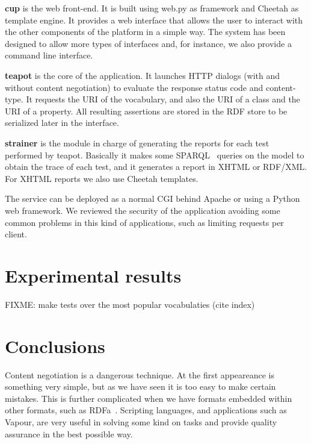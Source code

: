 \documentclass{../templates/llncs}
\begin{document}
\begin{description}

  \item \textbf{cup} is the web front-end. It is built using web.py as framework
        and Cheetah as template engine. It provides a web interface that allows 
        the user to interact with the other components of the platform in a 
        simple way. The system has been designed to allow more types 
        of interfaces and, for instance, we also provide a command line interface.

  \item \textbf{teapot} is the core of the application. It launches
        HTTP dialogs 
        (with and without content negotiation) to evaluate the response
        status code and content-type. It requests the URI of the vocabulary, and also the 
        URI of a class and the URI of a property. All resulting assertions are 
        stored in the RDF store to be serialized later in the interface.

  \item \textbf{strainer} is the module in charge of generating the reports for
        each test performed by teapot. Basically it makes some SPARQL~\cite{SPARQL} queries
        on the model to obtain the trace of each test, and it generates a
        report in XHTML or RDF/XML. For XHTML reports we also use Cheetah 
        templates.

\end{description}

The service can be deployed as a normal CGI behind Apache or using a Python web 
framework. We reviewed the security of the application avoiding some common problems
in this kind of applications, such as limiting requests per client.

\section{\label{sec:experimental}Experimental results}

FIXME: make tests over the most popular vocabulaties (cite index)

\section{\label{sec:conclusions}Conclusions}

Content negotiation is a dangerous technique. At the first appeareance is something very 
simple, but as we have seen it is too easy to make certain mistakes. This is 
further complicated when we have formats embedded within other formats,
such as RDFa~\cite{Birbeck2006}. Scripting languages, and applications such as 
Vapour, are very useful in solving some kind on tasks and provide quality 
assurance in the best possible way.
\end{document}
